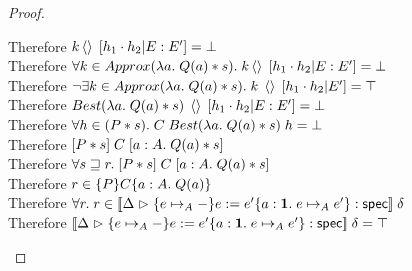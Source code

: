 \begin{proof}
\begin{tabbedproof}
    \ooooooo Therefore $k\left<\right>\;[h_1\cdot h_2|E:E'] = \bot$ \\
    \oooooo Therefore $\forall k \in Approx(\lambda a.\;Q(a) * s).\; k\left<\right>\;[h_1\cdot h_2|E:E'] = \bot$ \\
    \oooooo Therefore $\lnot \exists k \in Approx(\lambda a.\;Q(a) * s).\; k\;\left<\right>\;[h_1 \cdot h_2|E'] = \top$ \\
    \oooooo Therefore $Best(\lambda a.\;Q(a) * s)\;\left<\right>\;[h_1 \cdot h_2|E:E'] = \bot$ \\
    \ooooo Therefore $\forall h \in (P * s).\; C\;Best(\lambda a.\;Q(a) * s)\;h = \bot$ \\
    \ooooo Therefore $[{P * s}]\;{C}\;[{a:A}.\;{Q(a) * s}]$ \\
    \oooo Therefore $\forall s \sqsupseteq r.\; [{P * s}]\;{C}\;[{a:A}.\;{Q(a) * s}]$ \\
    \oooo Therefore $r \in \{{P}\}{C}\{{a:A}.\;{Q(a)}\}$ \\
    \ooo Therefore $\forall r.\; r \in [\![{{\Delta} \vartriangleright {\{{e \mapsto_A -}\}{e := e'}\{{a:\mathbf{1}}.\;{e \mapsto_A e'}\}} : \mathsf{spec}}]\!]\;\delta$ \\
    \ooo Therefore $[\![{{\Delta} \vartriangleright {\{{e \mapsto_A -}\}{e := e'}\{{a:\mathbf{1}}.\;{e \mapsto_A e'}\}} : \mathsf{spec}}]\!]\;\delta = \top$ \\
  \end{tabbedproof}
\end{proof}




